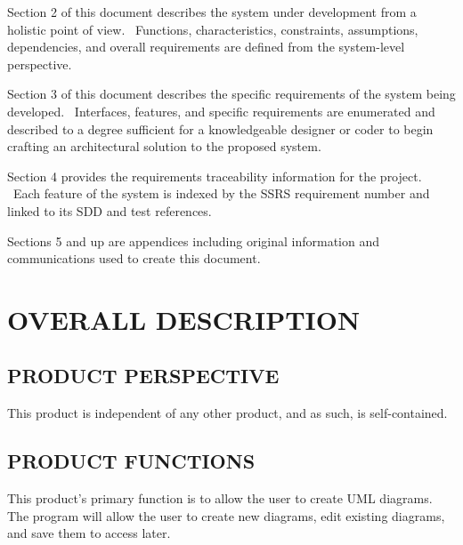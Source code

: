 \documentclass[twoside,letterpaper]{article}
\begin{document}
\bigskip

{\color{black}
Section 2 of this document describes the system under development from a
holistic point of view. \ Functions, characteristics, constraints,
assumptions, dependencies, and overall requirements are defined from
the system-level perspective.}


\bigskip

{\color{black}
Section 3 of this document describes the specific requirements of the
system being developed. \ Interfaces, features, and specific
requirements are enumerated and described to a degree sufficient for a
knowledgeable designer or coder to begin crafting an architectural
solution to the proposed system.}


\bigskip

{\color{black}
Section 4 provides the requirements traceability information for the
project. \ Each feature of the system is indexed by the SSRS
requirement number and linked to its SDD and test references.}


\bigskip

{\color{black}
Sections 5 and up are appendices including original information and
communications used to create this document.}











\clearpage\section[OVERALL DESCRIPTION]{\rmfamily\bfseries\color{black}
OVERALL DESCRIPTION}

\subsection[PRODUCT PERSPECTIVE]{\rmfamily\bfseries\color{black}
PRODUCT PERSPECTIVE}
{\color{black}
This product is independent of any other product, and as such, is self-contained.
}

\subsection[PRODUCT FUNCTIONS]{\rmfamily\bfseries\color{black}
PRODUCT FUNCTIONS}
{\color{black}
This product's primary function is to allow the user to create UML diagrams.  
The program will allow the user to create new diagrams, edit existing diagrams, and save them to access later.
}
\end{document}
